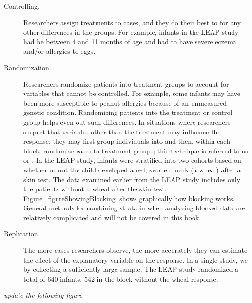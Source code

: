 \begin{doublespace}

\begin{description}

	\item[Controlling.] Researchers assign treatments to cases, and they do their best to  for any other differences in the groups.  For example, infants in the LEAP study had be between 4 and 11 months of age and had to have severe eczema and/or allergies to eggs.  

	\item[Randomization.] Researchers randomize patients into treatment groups to account for variables that cannot be controlled. For example, some infants may have been more susceptible to peanut allergies because of an unmeasured genetic condition. Randomizing patients into the treatment or control group helps even out such differences. In situations where researchers suspect that variables other than the treatment may influence the response, they may first group individuals into  and then, within each block, randomize cases to treatment groups; this technique is referred to as  or .  In the LEAP study, infants were stratified into two cohorts based on whether or not the child developed a red, swollen mark (a wheal) after a skin test.  The data examined earlier from the LEAP study includes only the patients without a wheal after the skin test. Figure~\ref{figureShowingBlocking} shows graphically how blocking works. General methods for combining strata in when analyzing blocked data are relatively complicated and will not be covered in this book.

	\item[Replication.] The more cases researchers observe, the more accurately they can estimate the effect of the explanatory variable on the response. In a single study, we  by collecting a sufficiently large sample.  The LEAP study randomized a total of 640 infants, 542 in the block without the wheal response.

\end{description}
	

\textit{update the following figure}


\end{doublespace}
